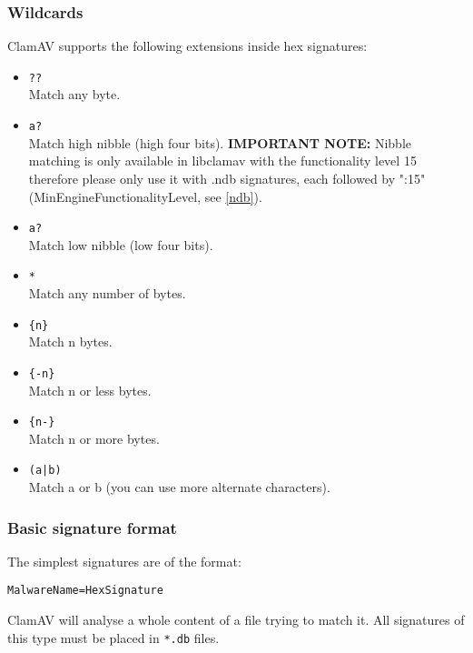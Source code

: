 \documentclass[a4paper,titlepage,12pt]{article}
\begin{document}
    \subsubsection{Wildcards}
    ClamAV supports the following extensions inside hex signatures:
    \begin{itemize}
	\item \verb+??+\\
	Match any byte.
	\item \verb+a?+\\
	Match high nibble (high four bits). \textbf{IMPORTANT NOTE:} Nibble
	matching is only available in libclamav with the functionality level
	15 therefore please only use it with .ndb signatures, each followed
	by ":15" (MinEngineFunctionalityLevel, see \ref{ndb}).
	\item \verb+a?+\\
	Match low nibble (low four bits).
	\item \verb+*+\\
	Match any number of bytes.
	\item \verb+{n}+\\
	Match n bytes.
	\item \verb+{-n}+\\
	Match n or less bytes.
	\item \verb+{n-}+\\
	Match n or more bytes.
	\item \verb+(a|b)+\\
	Match a or b (you can use more alternate characters).
    \end{itemize}

    \subsubsection{Basic signature format}
    The simplest signatures are of the format:
    \begin{verbatim}
MalwareName=HexSignature
    \end{verbatim}
    ClamAV will analyse a whole content of a file trying to match it. All
    signatures of this type must be placed in \verb+*.db+ files.
\end{document}
